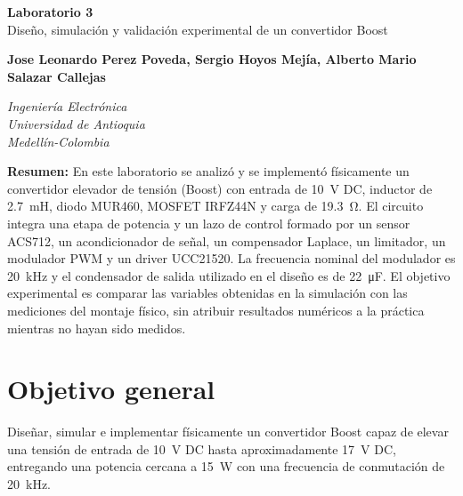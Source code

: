 \documentclass[12pt]{article}
\newcommand{\estudiantes}{Jose Leonardo Perez Poveda, Sergio Hoyos Mejía, Alberto Mario Salazar Callejas}
\begin{document}
\vspace*{-1cm}
\begin{center}
{\Huge\textcolor{tituloazul}{\textbf{Laboratorio 3}\\Diseño, simulación y validación experimental de un convertidor Boost}}
\vspace{0.2cm}

{\textbf{\estudiantes}}
\vspace{0.2cm}

\textit{Ingeniería Electrónica}\\
\textit{Universidad de Antioquia}\\
\textit{Medellín-Colombia}
\end{center}
\vspace{0.3cm}

\noindent\textcolor{tituloazul}{\textbf{Resumen:}} En este laboratorio se analizó y se implementó físicamente un convertidor elevador de tensión (Boost) con entrada de \SI{10}{V} DC, inductor de \SI{2.7}{mH}, diodo MUR460, MOSFET IRFZ44N y carga de \SI{19.3}{\ohm}. El circuito integra una etapa de potencia y un lazo de control formado por un sensor ACS712, un acondicionador de señal, un compensador Laplace, un limitador, un modulador PWM y un driver UCC21520. La frecuencia nominal del modulador es \SI{20}{kHz} y el condensador de salida utilizado en el diseño es de \SI{22}{\micro F}. El objetivo experimental es comparar las variables obtenidas en la simulación con las mediciones del montaje físico, sin atribuir resultados numéricos a la práctica mientras no hayan sido medidos.

\section{Objetivo general}
Diseñar, simular e implementar físicamente un convertidor Boost capaz de elevar una tensión de entrada de \SI{10}{V} DC hasta aproximadamente \SI{17}{V} DC, entregando una potencia cercana a \SI{15}{W} con una frecuencia de conmutación de \SI{20}{kHz}.
\end{document}
